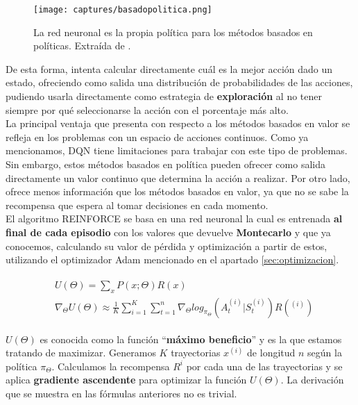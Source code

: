 \documentclass[11pt,fleqn]{book} %
\begin{document}
\begin{figure}[H]
	\centering\texttt{[image: captures/basadopolitica.png]}
	\caption{La red neuronal es la propia política para los métodos basados en políticas. Extraída de \cite{article:RLromero}.}
	\label{fig:reinforce} %
\end{figure}

De esta forma, intenta calcular directamente cuál es la mejor acción dado un estado, ofreciendo como salida una distribución de probabilidades de las acciones, pudiendo usarla directamente como estrategia de \textbf{exploración} al no tener siempre por qué seleccionarse la acción con el porcentaje más alto. \\

La principal ventaja que presenta con respecto a los métodos basados en valor se refleja en los problemas con un espacio de acciones continuos. Como ya mencionamos, DQN tiene limitaciones para trabajar con este tipo de problemas. Sin embargo, estos métodos basados en política pueden ofrecer como salida directamente un valor continuo que determina la acción a realizar. Por otro lado, ofrece menos información que los métodos basados en valor, ya que no se sabe la recompensa que espera al tomar decisiones en cada momento.\\

El algoritmo REINFORCE \cite{article:RLromero} \cite{book:miguel} \cite{article:basadopolitica} se basa en una red neuronal la cual es entrenada \textbf{al final de cada episodio} con los valores que devuelve \textbf{Montecarlo} y que ya conocemos, calculando su valor de pérdida y optimización a partir de estos, utilizando el optimizador Adam mencionado en el apartado \ref{sec:optimizacion}.

\begin{align}
\begin{split}
&U(\Theta)=\sum_xP(x;\Theta)R(x)\\
&\nabla_\Theta U(\Theta) \approx \frac{1}{K}\sum^K_{i=1}\sum^n_{t=1}\nabla_\Theta log_{\pi_\Theta}(A^{(i)}_t|S^{(i)}_t)R(^{(i)})
\end{split}
\end{align}

$U(\Theta)$ es conocida como la función ``\textbf{máximo beneficio}'' y es la que estamos tratando de maximizar. Generamos $K$ trayectorias $x^{(i)}$ de longitud $n$ según la política $\pi_ \Theta$. Calculamos la recompensa $R^i$ por cada una de las trayectorias y se aplica \textbf{gradiente ascendente} para optimizar la función $U(\Theta)$. La derivación que se muestra en las fórmulas anteriores no es trivial.\\
\end{document}
